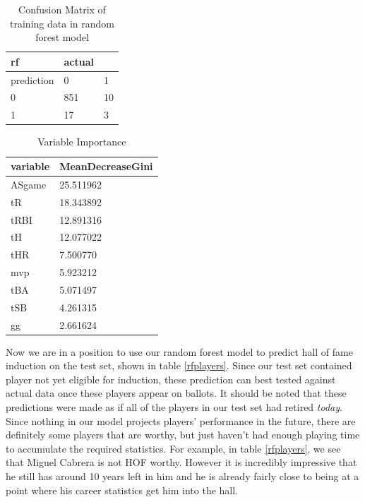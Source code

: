 \documentclass[preprint,12pt]{elsarticle}
\begin{document}
\begin{table}[h]
\centering
\begin{tabular}{|l |l l|}
\hline
 rf &  actual & \\
\hline
prediction & 0 & 1 \\
0 & 851 & 10 \\
1 & 17 & 3 \\
\hline
\end{tabular}
\caption{Confusion Matrix of training data in random forest model}
\label{rfconf}
\end{table}

\begin{table}[h]
\centering
\begin{tabular}{|l |l|}
\hline
 variable & MeanDecreaseGini\\
\hline
ASgame & 25.511962 \\
tR     & 18.343892 \\
tRBI   & 12.891316 \\
tH     & 12.077022 \\
tHR    &  7.500770 \\
mvp    &  5.923212 \\
tBA    &  5.071497 \\
tSB    &  4.261315 \\
gg     &  2.661624 \\
\hline
\end{tabular}
\caption{Variable Importance}
\label{varImp}
\end{table}

Now we are in a position to use our random forest model to predict hall of fame induction on the test set, shown in table \ref{rfplayers}. Since our test set contained player not yet eligible for induction, these prediction can best tested against actual data once these players appear on ballots. It should be noted that these predictions were made as if all of the players in our test set had retired \textit{today}. Since nothing in our model projects players' performance in the future, there are definitely some players that are worthy, but just haven't had enough playing time to accumulate the required statistics. For example, in table \ref{rfplayers}, we see that Miguel Cabrera is not HOF worthy. However it is incredibly impressive that he still has around 10 years left in him and he is already fairly close to being at a point where his career statistics get him into the hall.
\end{document}
